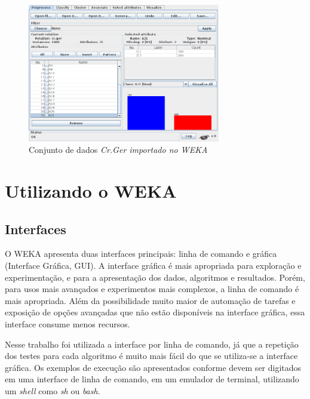 \vspace{0.5cm}
\begin{figure}[h!]
    \centering
    \caption{Conjunto de dados \emph{Cr.Ger importado no WEKA}}
    \label{fig:dev_weka_arff}
    \vspace{0.5cm}
    \includegraphics[width=0.75\textwidth]{img/cr_ger.png}
    \vspace{0.5cm}
\end{figure}
\vspace{0.5cm}

\section{Utilizando o WEKA}

\subsection{Interfaces}

O WEKA apresenta duas interfaces principais: linha de comando e gráfica (Interface Gráfica, GUI). A interface gráfica é mais apropriada para exploração e experimentação, e para a apresentação dos dados, algoritmos e resultados. Porém, para usos mais avançados e experimentos mais complexos, a linha de comando é mais apropriada. Além da possibilidade muito maior de automação de tarefas e exposição de opções avançadas que não estão disponíveis na interface gráfica, essa interface consume menos recursos.

Nesse trabalho foi utilizada a interface por linha de comando, já que a repetição dos testes para cada algoritmo é muito mais fácil do que se utiliza-se a interface gráfica. Os exemplos de execução são apresentados conforme devem ser digitados em uma interface de linha de comando, em um emulador de terminal, utilizando um \emph{shell} como \emph{sh} ou \emph{bash}.

